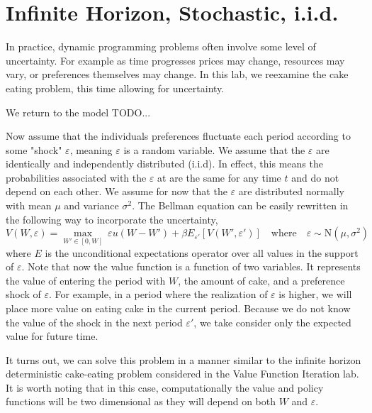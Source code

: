 \newcommand\ve{\varepsilon}


\section{Infinite Horizon, Stochastic, i.i.d.}\label{SecRecProbInfinHorStochiid}

In practice, dynamic programming problems often involve some level of uncertainty.  For example as time progresses prices may change, resources may vary, or preferences themselves may change.  In this lab, we reexamine the cake eating problem, this time allowing for uncertainty.

We return to the model TODO...

Now assume that the individuals preferences fluctuate each period according to some "shock" $\ve$, meaning $\ve$ is a random variable.  We assume that the $\ve$ are identically and independently distributed (i.i.d).  In effect, this means the probabilities associated with the $\ve$ at are the same for any time $t$ and do not depend on each other.  We assume for now that the $\ve$ are distributed normally with mean $\mu$ and variance $\sigma^2$.  The Bellman equation can be easily rewritten in the following way to incorporate the uncertainty,
\begin{equation*}\label{stoch_Bellman}
   V\left(W,\ve\right) = \max_{W'\in[0,W]}\: \ve u\left(W - W'\right) + \beta E_{\ve'}\left[V\left(W',\ve'\right)\right] \quad\text{where}\quad \ve \sim \text{N}(\mu,\sigma^2)
\end{equation*}
where $E$ is the unconditional expectations operator over all values in the support of $\ve$.  Note that now the value function is a function of two variables.  It represents the value of entering the period with $W$, the amount of cake, and a preference shock of $\ve$.  For example, in a period where the realization of $\ve$ is higher, we will place more value on eating cake in the current period.  Because we do not know the value of the shock in the next period $\ve'$, we take consider only the expected value for future time.

It turns out, we can solve this problem in a manner similar to the infinite horizon deterministic cake-eating problem considered in the Value Function Iteration lab.  It is worth noting that in this case, computationally the value and policy functions will be two dimensional as they will depend on both $W$ and $\ve$.

